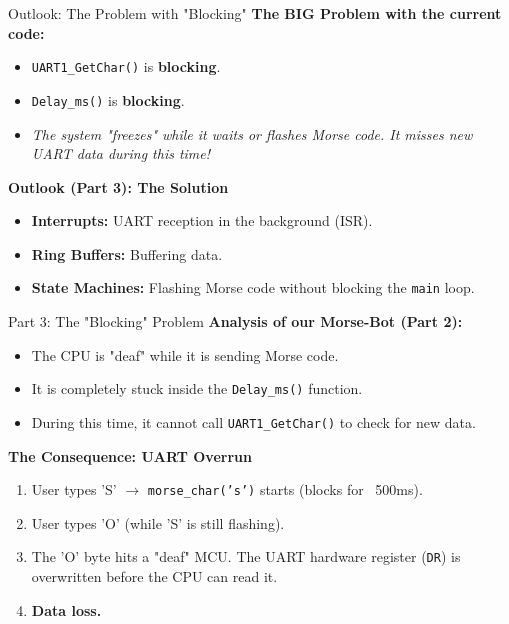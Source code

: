 \documentclass{beamer}
\begin{document}
		\begin{frame}{Outlook: The Problem with "Blocking"}
			\textbf{The BIG Problem with the current code:}
			\begin{itemize}
				\item \texttt{UART1\_GetChar()} is \textbf{blocking}.
				\item \texttt{Delay\_ms()} is \textbf{blocking}.
				\item \textit{The system "freezes" while it waits or flashes Morse code. It misses new UART data during this time!}
			\end{itemize}
			
			\bigskip
			\textbf{Outlook (Part 3): The Solution}
			\begin{itemize}
				\item \textbf{Interrupts:} UART reception in the background (ISR).
				\item \textbf{Ring Buffers:} Buffering data.
				\item \textbf{State Machines:} Flashing Morse code without blocking the \texttt{main} loop.
			\end{itemize}
		\end{frame}
\begin{frame}{Part 3: The "Blocking" Problem}
\textbf{Analysis of our Morse-Bot (Part 2):}
\begin{itemize}
\item The CPU is "deaf" while it is sending Morse code.
\item It is completely stuck inside the \texttt{Delay\_ms()} function.
\item During this time, it cannot call \texttt{UART1\_GetChar()} to check for new data.
\end{itemize}
	
	\bigskip
	\textbf{The Consequence: UART Overrun}
\begin{enumerate}
\item User types 'S' $\rightarrow$ \texttt{morse\_char('s')} starts (blocks for ~500ms).
\item User types 'O' (while 'S' is still flashing).
\item The 'O' byte hits a "deaf" MCU. The UART hardware register (\texttt{DR}) is overwritten before the CPU can read it.
\item \textbf{Data loss.}
	\end{enumerate}
	\end{frame}
	
\end{document}
